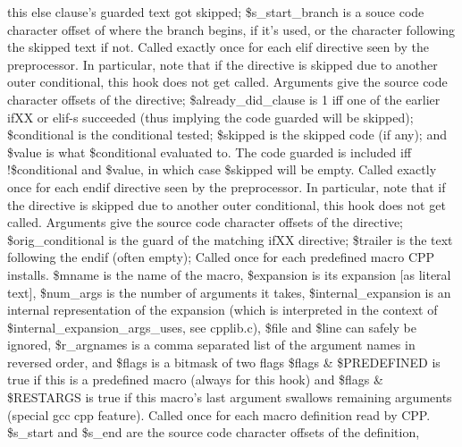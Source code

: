 this \pphash{}else clause's guarded text got skipped; \$s\_\-start\_\-branch is a souce code
character offset of where the branch begins, if it's used, or the character
following the skipped text if not.
Called exactly once for each \pphash{}elif directive seen by the preprocessor. In particular,
note that if the directive is skipped due to another outer conditional, this
hook does not get called.
Arguments give the source code character
offsets of the directive; \$already\_\-did\_\-clause is 1 iff one of the
earlier \pphash{}ifXX or \pphash{}elif-s succeeded (thus implying the code guarded will be skipped);
\$conditional is the conditional tested; \$skipped is the skipped code (if any);
and \$value is what \$conditional evaluated to.  The code guarded is
included iff !\$conditional and \$value, in which case \$skipped will be empty.
Called exactly once for each \pphash{}endif directive seen by the preprocessor. In particular,
note that if the directive is skipped due to another outer conditional, this
hook does not get called.
Arguments give the source code character
offsets of the directive; \$orig\_\-conditional is the guard of the matching
\pphash{}ifXX directive; \$trailer is the text following the \pphash{}endif (often empty);
Called once for each predefined macro CPP installs.
\$mname is the name of the macro, \$expansion is its expansion [as literal text], 
\$num\_\-args is the number of arguments it takes, \$internal\_\-expansion is an
internal representation of the expansion (which is interpreted in the 
context of \$internal\_\-expansion\_\-args\_\-uses, see cpplib.c), \$file and \$line
can safely be ignored, \$r\_\-argnames is a comma separated list of the
argument names in reversed order, and \$flags is a bitmask of two flags
\$flags \& \$PREDEFINED is true if this is a predefined macro (always for this hook)
and \$flags \& \$RESTARGS is true if this macro's last argument swallows 
remaining arguments (special gcc cpp feature).
Called once for each macro definition read by  CPP.
\$s\_\-start and \$s\_\-end are the source code character offsets of the definition,
